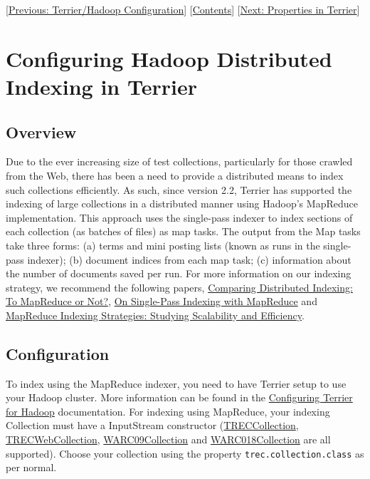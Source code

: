 {[}\href{hadoop_configuration.html}{Previous: Terrier/Hadoop
Configuration}{]} {[}\href{index.html}{Contents}{]}
{[}\href{properties.html}{Next: Properties in Terrier}{]}\\

\section{Configuring Hadoop Distributed Indexing in
Terrier}\label{configuring-hadoop-distributed-indexing-in-terrier}

\subsection{Overview}\label{overview}

Due to the ever increasing size of test collections, particularly for
those crawled from the Web, there has been a need to provide a
distributed means to index such collections efficiently. As such, since
version 2.2, Terrier has supported the indexing of large collections in
a distributed manner using Hadoop's MapReduce implementation. This
approach uses the single-pass indexer to index sections of each
collection (as batches of files) as map tasks. The output from the Map
tasks take three forms: (a) terms and mini posting lists (known as runs
in the single-pass indexer); (b) document indices from each map task;
(c) information about the number of documents saved per run. For more
information on our indexing strategy, we recommend the following papers,
\href{http://ir.dcs.gla.ac.uk/terrier/publications/mccreadie09sigirLS.pdf}{Comparing
Distributed Indexing: To MapReduce or Not?},
\href{http://ir.dcs.gla.ac.uk/terrier/publications/sigir09_mccreadie_mapreduce.pdf}{On
Single-Pass Indexing with MapReduce} and
\href{http://dx.doi.org/10.1016/j.ipm.2010.12.003}{MapReduce Indexing
Strategies: Studying Scalability and Efficiency}.

\subsection{Configuration}\label{configuration}

To index using the MapReduce indexer, you need to have Terrier setup to
use your Hadoop cluster. More information can be found in the
\href{hadoop_configuration.html}{Configuring Terrier for Hadoop}
documentation. For indexing using MapReduce, your indexing Collection
must have a InputStream constructor
(\href{javadoc/org/terrier/indexing/TRECCollection.html}{TRECCollection},
\href{javadoc/org/terrier/indexing/TRECWebCollection.html}{TRECWebCollection},
\href{javadoc/org/terrier/indexing/WARC09Collection.html}{WARC09Collection}
and
\href{javadoc/org/terrier/indexing/WARC018Collection.html}{WARC018Collection}
are all supported). Choose your collection using the property
\texttt{trec.collection.class} as per normal.

